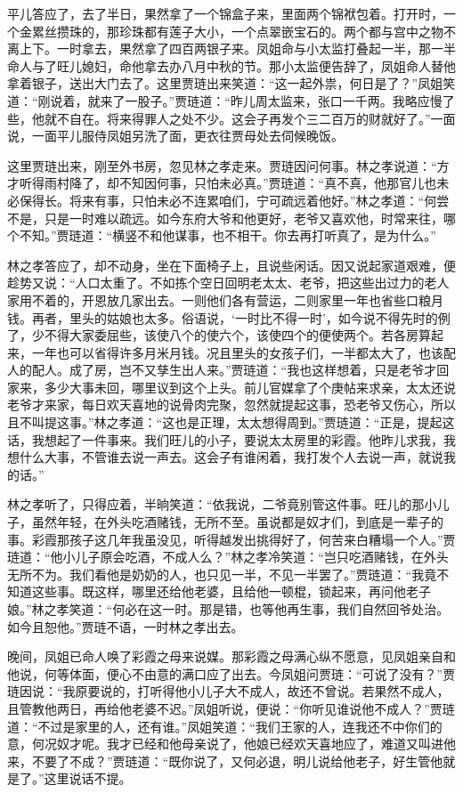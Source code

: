 \documentclass[12pt,oneside]{book}
\begin{document}
平儿答应了，去了半日，果然拿了一个锦盒子来，里面两个锦袱包着。打开时，一个金累丝攒珠的，那珍珠都有莲子大小，一个点翠嵌宝石的。两个都与宫中之物不离上下。一时拿去，果然拿了四百两银子来。凤姐命与小太监打叠起一半，那一半命人与了旺儿媳妇，命他拿去办八月中秋的节。那小太监便告辞了，凤姐命人替他拿着银子，送出大门去了。这里贾琏出来笑道：“这一起外祟，何日是了？”凤姐笑道：“刚说着，就来了一股子。”贾琏道：“昨儿周太监来，张口一千两。我略应慢了些，他就不自在。将来得罪人之处不少。这会子再发个三二百万的财就好了。”一面说，一面平儿服侍凤姐另洗了面，更衣往贾母处去伺候晚饭。

这里贾琏出来，刚至外书房，忽见林之孝走来。贾琏因问何事。林之孝说道：“方才听得雨村降了，却不知因何事，只怕未必真。”贾琏道：“真不真，他那官儿也未必保得长。将来有事，只怕未必不连累咱们，宁可疏远着他好。”林之孝道：“何尝不是，只是一时难以疏远。如今东府大爷和他更好，老爷又喜欢他，时常来往，哪个不知。”贾琏道：“横竖不和他谋事，也不相干。你去再打听真了，是为什么。”

林之孝答应了，却不动身，坐在下面椅子上，且说些闲话。因又说起家道艰难，便趁势又说：“人口太重了。不如拣个空日回明老太太、老爷，把这些出过力的老人家用不着的，开恩放几家出去。一则他们各有营运，二则家里一年也省些口粮月钱。再者，里头的姑娘也太多。俗语说，‘一时比不得一时’，如今说不得先时的例了，少不得大家委屈些，该使八个的使六个，该使四个的便使两个。若各房算起来，一年也可以省得许多月米月钱。况且里头的女孩子们，一半都太大了，也该配人的配人。成了房，岂不又孳生出人来。”贾琏道：“我也这样想着，只是老爷才回家来，多少大事未回，哪里议到这个上头。前儿官媒拿了个庚帖来求亲，太太还说老爷才来家，每日欢天喜地的说骨肉完聚，忽然就提起这事，恐老爷又伤心，所以且不叫提这事。”林之孝道：“这也是正理，太太想得周到。”贾琏道：“正是，提起这话，我想起了一件事来。我们旺儿的小子，要说太太房里的彩霞。他昨儿求我，我想什么大事，不管谁去说一声去。这会子有谁闲着，我打发个人去说一声，就说我的话。”

林之孝听了，只得应着，半晌笑道：“依我说，二爷竟别管这件事。旺儿的那小儿子，虽然年轻，在外头吃酒赌钱，无所不至。虽说都是奴才们，到底是一辈子的事。彩霞那孩子这几年我虽没见，听得越发出挑得好了，何苦来白糟塌一个人。”贾琏道：“他小儿子原会吃酒，不成人么？”林之孝冷笑道：“岂只吃酒赌钱，在外头无所不为。我们看他是奶奶的人，也只见一半，不见一半罢了。”贾琏道：“我竟不知道这些事。既这样，哪里还给他老婆，且给他一顿棍，锁起来，再问他老子娘。”林之孝笑道：“何必在这一时。那是错，也等他再生事，我们自然回爷处治。如今且恕他。”贾琏不语，一时林之孝出去。

晚间，凤姐已命人唤了彩霞之母来说媒。那彩霞之母满心纵不愿意，见凤姐亲自和他说，何等体面，便心不由意的满口应了出去。今凤姐问贾琏：“可说了没有？”贾琏因说：“我原要说的，打听得他小儿子大不成人，故还不曾说。若果然不成人，且管教他两日，再给他老婆不迟。”凤姐听说，便说：“你听见谁说他不成人？”贾琏道：“不过是家里的人，还有谁。”凤姐笑道：“我们王家的人，连我还不中你们的意，何况奴才呢。我才已经和他母亲说了，他娘已经欢天喜地应了，难道又叫进他来，不要了不成？”贾琏道：“既你说了，又何必退，明儿说给他老子，好生管他就是了。”这里说话不提。
\end{document}
